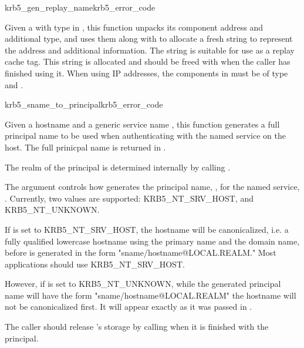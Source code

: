 \begin{funcdecl}{krb5_gen_replay_name}{krb5_error_code}{\funcin}
\funcout
{}
\end{funcdecl}

Given a  with type 
in , this function unpacks its component address and
additional type, and uses them along with  to allocate a
fresh string to represent the address and additional information.  The
string is suitable for use as a replay cache tag.  This string is
allocated and should be freed with  when the caller has
finished using it.  When using IP addresses, the components in
 must be of type
 and .


\begin{funcdecl}{krb5_sname_to_principal}{krb5_error_code}{\funcin}
\funcout
{}
\end{funcdecl}

Given a hostname  and a generic service name
, this function generates a full principal name to be
used when authenticating with the named service on the host.  The full
prinicpal name is  returned  in .

The realm of the
principal is determined internally by calling .

The  argument controls how
 generates the principal name,
, for the named service, .
Currently, two values 	are supported: KRB5_NT_SRV_HOST, and
KRB5_NT_UNKNOWN.  

If  is set to
KRB5_NT_SRV_HOST, the hostname will be
canonicalized, i.e. a fully qualified lowercase hostname using
the primary name and the domain name, before  is
generated in the form
"sname/hostname@LOCAL.REALM." Most applications should use
KRB5_NT_SRV_HOST.  

However, if  is set to KRB5_NT_UNKNOWN,
while the generated principal name will have 	the form
"sname/hostname@LOCAL.REALM" the hostname will not be canonicalized
first.  It will appear exactly as it was passed in .  

The caller should release 's storage by calling
 when it is finished with the principal.
